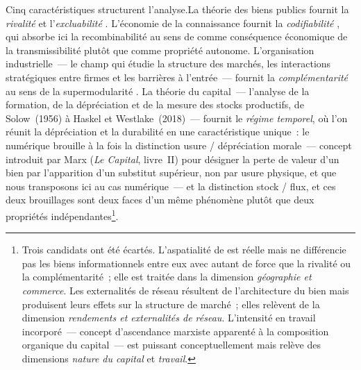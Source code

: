 Cinq caractéristiques structurent l'analyse.\nopagebreak La théorie des biens publics fournit la \emph{rivalité} et l'\emph{excluabilité} \parencite{samuelson_pure_1954,musgrave_theory_1959,ostrom_governing_1990}. L'économie de la connaissance fournit la \emph{codifiabilité} \parencite{polanyi_tacit_1966,cowan_explicit_2000}, qui absorbe ici la recombinabilité au sens de \textcite{weitzman_recombinant_1998} comme conséquence économique de la transmissibilité plutôt que comme propriété autonome. L'organisation industrielle~--- le champ qui étudie la structure des marchés, les interactions stratégiques entre firmes et les barrières à l'entrée~--- fournit la \emph{complémentarité} au sens de la supermodularité \parencite{milgrom_economics_1990}. La théorie du capital~--- l'analyse de la formation, de la dépréciation et de la mesure des stocks productifs, de Solow~(1956) à Haskel et Westlake~(2018)~--- fournit le \emph{régime temporel}, où l'on réunit la dépréciation \parencite{haskel_capitalism_2018} et la durabilité \parencite{hill_goods_1977} en une caractéristique unique~: le numérique brouille à la fois la distinction usure / dépréciation morale~--- concept introduit par Marx (\emph{Le Capital}, livre~II) pour désigner la perte de valeur d'un bien par l'apparition d'un substitut supérieur, non par usure physique, et que nous transposons ici au cas numérique~--- et la distinction stock / flux, et ces deux brouillages sont deux faces d'un même phénomène plutôt que deux propriétés indépendantes\footnote{Trois candidats ont été écartés. L'aspatialité de \textcite{quah_digital_2003} est réelle mais ne différencie pas les biens informationnels entre eux avec autant de force que la rivalité ou la complémentarité~; elle est traitée dans la dimension \emph{géographie et commerce}. Les externalités de réseau \parencite{katz_network_1985} résultent de l'architecture du bien mais produisent leurs effets sur la structure de marché~; elles relèvent de la dimension \emph{rendements et externalités de réseau}. L'intensité en travail incorporé~--- concept d'ascendance marxiste apparenté à la composition organique du capital~--- est puissant conceptuellement mais relève des dimensions \emph{nature du capital} et \emph{travail}.}.

